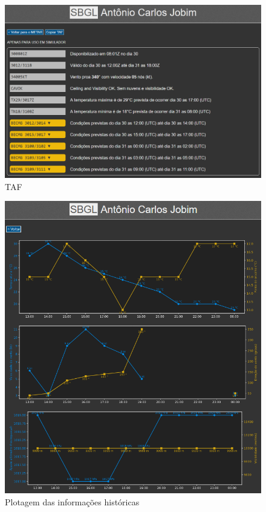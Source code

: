 \begin{figure}[ht]
    \begin{center}
    \includegraphics[width=400pt]{img/img-taf.png}
    \caption{TAF}
    \label{fig:img-taf.png}
    \end{center}
\end{figure}

\begin{figure}[ht]
    \begin{center}
    \includegraphics[width=400pt]{img/img-history.png}
    \caption{Plotagem das informações históricas}
    \label{fig:img-history.png}
    \end{center}
\end{figure}

